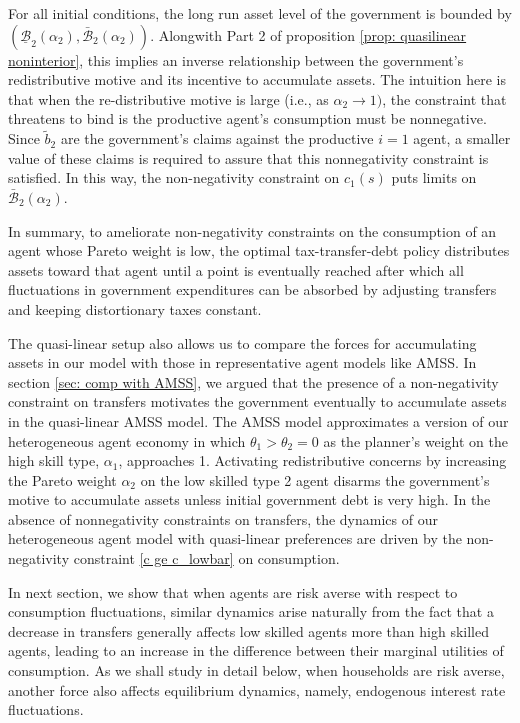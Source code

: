 \documentclass[thmsb,11pt]{article}
\begin{document}
{%
For all initial conditions, the long run asset level of the government is  bounded by $\left( \underline{\mathcal{B}}_{2}\left( \alpha
_{2}\right) ,\mathcal{\bar{\mathcal{B}}}_{2}\left( \alpha _{2}\right)
\right) $. Alongwith Part 2 of proposition \ref{prop: quasilinear noninterior}, this implies an inverse
 relationship between the government's redistributive motive  and its incentive to
accumulate assets. The intuition here is that when  the re-distributive
motive is large (i.e., as  $\alpha _{2}\rightarrow 1)$, the  constraint that threatens to bind
is the productive agent's consumption must be nonnegative. Since $\tilde{b}%
_{2}$ are the government's claims against the productive $i=1$ agent,  a smaller value of these
claims is required to assure that this nonnegativity constraint is satisfied. In this way, the non-negativity constraint on
$c_1(s)$  puts limits on $\bar{\mathcal{B}}_{2}(\alpha _{2})$.

In summary, to ameliorate non-negativity constraints on the consumption of an  agent whose Pareto weight is low, the optimal tax-transfer-debt policy  distributes assets  toward that agent  until a point is eventually  reached after which  all fluctuations in government expenditures can be absorbed by adjusting transfers and keeping distortionary taxes constant. 


 The quasi-linear setup also allows us to compare the forces for accumulating assets  in our model with those in
   representative agent models like AMSS. In section \ref{sec: comp with AMSS}, we argued that the presence of  a non-negativity constraint on transfers  motivates the government eventually to accumulate  assets in the  quasi-linear AMSS model.  The AMSS  model   approximates a version
   of our heterogeneous agent economy in which $\theta_1 > \theta_2 = 0$ as the planner's weight on the high skill type, $\alpha_1$, approaches 1.  Activating redistributive concerns by increasing the Pareto weight
 $\alpha_2$ on  the low skilled type 2 agent disarms the government's motive  to accumulate assets unless  initial government debt is very high.
 In the absence of nonnegativity  constraints on transfers, the dynamics of our heterogeneous agent model with quasi-linear preferences are driven by the non-negativity constraint \eqref{c ge c_lowbar} on consumption.

 In next section, we show that when agents are
risk averse with respect to consumption fluctuations, similar dynamics arise naturally from the fact that a decrease
in transfers generally affects low skilled agents more than high skilled
agents, leading to an increase in the difference between  their marginal utilities of
consumption. As we shall study in detail below,  when households are risk averse, another
force also affects  equilibrium dynamics, namely, endogenous interest rate fluctuations.

}
\end{document}

